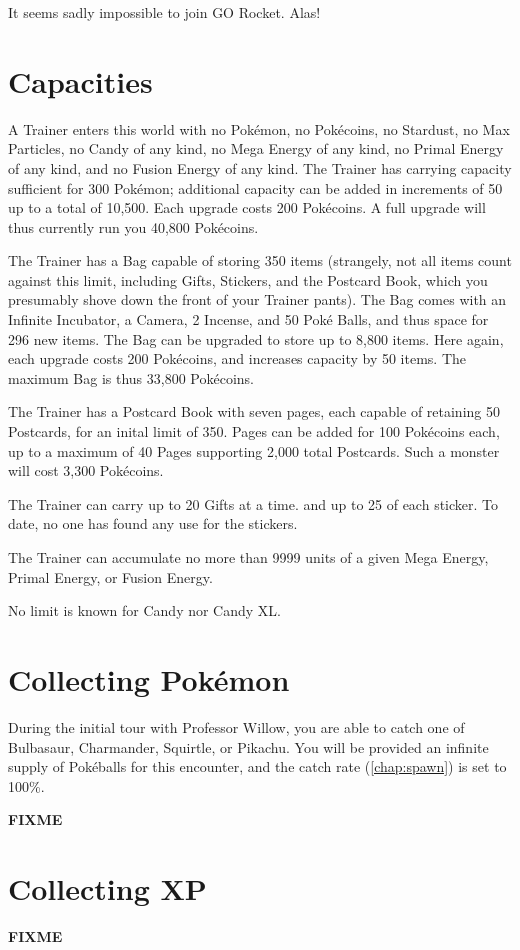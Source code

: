 It seems sadly impossible to join GO Rocket. Alas!

\section{Capacities}
A Trainer enters this world with no Pokémon, no Pokécoins, no Stardust,
  no Max Particles, no Candy of any kind, no Mega Energy of any kind,
  no Primal Energy of any kind, and no Fusion Energy of any kind.
The Trainer has carrying capacity sufficient for 300 Pokémon; additional
  capacity can be added in increments of 50 up to a total of 10,500.
Each upgrade costs 200 Pokécoins.
A full upgrade will thus currently run you 40,800 Pokécoins.

The Trainer has a Bag capable of storing 350 items (strangely, not all items
  count against this limit, including Gifts, Stickers, and the Postcard Book,
  which you presumably shove down the front of your Trainer pants).
The Bag comes with an Infinite Incubator, a Camera, 2 Incense, and 50 Poké Balls,
  and thus space for 296 new items.
The Bag can be upgraded to store up to 8,800 items.
Here again, each upgrade costs 200 Pokécoins, and increases capacity by 50 items.
The maximum Bag is thus 33,800 Pokécoins.

The Trainer has a Postcard Book with seven pages, each capable of retaining
 50 Postcards, for an inital limit of 350.
Pages can be added for 100 Pokécoins each, up to a maximum of 40 Pages
 supporting 2,000 total Postcards.
Such a monster will cost 3,300 Pokécoins.

The Trainer can carry up to 20 Gifts at a time. and up to 25 of each sticker.
To date, no one has found any use for the stickers.

The Trainer can accumulate no more than 9999 units of a given Mega Energy,
 Primal Energy, or Fusion Energy.

No limit is known for Candy nor Candy XL.

\section{Collecting Pokémon}
During the initial tour with Professor Willow, you are able to catch one of
 Bulbasaur, Charmander, Squirtle, or Pikachu.
You will be provided an infinite supply of Pokéballs for this encounter, and
 the catch rate (\autoref{chap:spawn}) is set to 100\%.

\textbf{FIXME}

\section{Collecting XP}
\textbf{FIXME}

